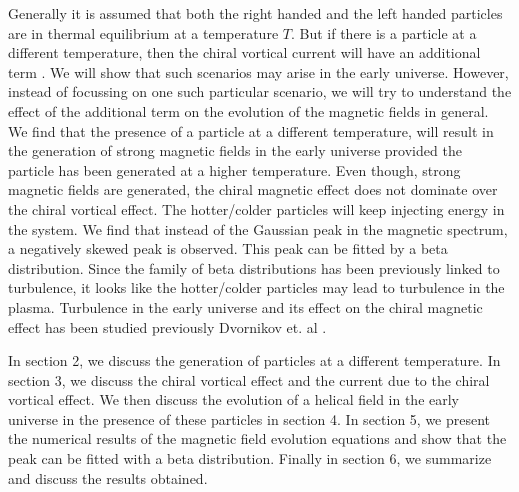 \documentclass{ws-mpla}
\begin{document}
Generally it is assumed that both the right handed and the left handed particles are in thermal equilibrium at a temperature $T$. But if there is a 
particle at a different temperature, then the chiral vortical current will have an additional term \cite{vilenkin}. We will show that such scenarios may arise 
in the early universe. However, instead of focussing on one such particular scenario,
we will try to understand the effect of the additional term on the evolution of the magnetic fields in general. We find that the presence of a particle at a 
different temperature, will result in the generation of strong magnetic fields in the early universe provided the particle has been generated at a higher 
temperature. Even though, strong magnetic fields are generated, the chiral magnetic effect does not dominate over the chiral vortical effect. The hotter/colder 
particles will keep injecting energy in the system. We find that instead of the Gaussian peak in the magnetic spectrum, a negatively skewed peak is observed. 
This peak can be fitted by a beta distribution. Since the family of beta distributions has been previously linked to turbulence, it looks like the hotter/colder particles 
may lead to turbulence in the plasma. Turbulence in the early universe and its effect on the chiral magnetic effect has been studied previously 
Dvornikov et. al \cite{dvornikov}. 


In section 2, we discuss the generation of particles at a different temperature. In section 3, we discuss the chiral vortical effect and 
the current due to the chiral vortical effect.  We then discuss the evolution of a helical field in the early 
universe in the presence of these particles in section 4. In section 5, we present the numerical results of the magnetic field evolution equations
and show that the peak can be fitted with a beta distribution.  Finally in section 6, we summarize and discuss the results obtained.  
\end{document}
